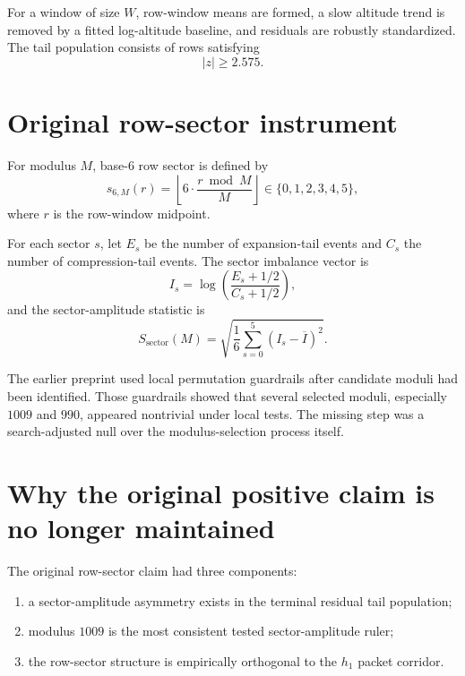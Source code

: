 \documentclass[11pt]{article}
\newcommand{\zprimary}{2.575}
\newcommand{\Ssector}{S_{\mathrm{sector}}}
\begin{document}
For a window of size \(W\), row-window means are formed, a slow altitude trend is removed by a fitted log-altitude baseline, and residuals are robustly standardized. The tail population consists of rows satisfying
\[
|z|\ge \zprimary.
\]

\section{Original row-sector instrument}

For modulus \(M\), base-6 row sector is defined by
\begin{equation}
    s_{6,M}(r)
    =
    \left\lfloor 6\cdot\frac{r\bmod M}{M}\right\rfloor
    \in\{0,1,2,3,4,5\},
    \label{eq:sector}
\end{equation}
where \(r\) is the row-window midpoint.

For each sector \(s\), let \(E_s\) be the number of expansion-tail events and \(C_s\) the number of compression-tail events. The sector imbalance vector is
\begin{equation}
    I_s=\log\left(\frac{E_s+1/2}{C_s+1/2}\right),
\end{equation}
and the sector-amplitude statistic is
\begin{equation}
    \Ssector(M)
    =
    \sqrt{
    \frac{1}{6}\sum_{s=0}^{5}
    \left(I_s-\overline{I}\right)^2
    }.
    \label{eq:ssector}
\end{equation}

The earlier preprint used local permutation guardrails after candidate moduli had been identified. Those guardrails showed that several selected moduli, especially \(1009\) and \(990\), appeared nontrivial under local tests. The missing step was a search-adjusted null over the modulus-selection process itself.

\section{Why the original positive claim is no longer maintained}

The original row-sector claim had three components:
\begin{enumerate}
    \item a sector-amplitude asymmetry exists in the terminal residual tail population;
    \item modulus \(1009\) is the most consistent tested sector-amplitude ruler;
    \item the row-sector structure is empirically orthogonal to the \(h_1\) packet corridor.
\end{enumerate}
\end{document}

